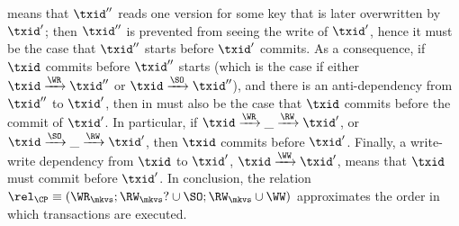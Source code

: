 means that $\txid''$ reads one version for some key that 
is later overwritten by $\txid'$; then $\txid''$ is prevented from seeing the write of $\txid'$, 
hence it {must} be the case that $\txid''$ starts before 
$\txid'$ commits. 
As a consequence, if $\txid$ commits before $\txid''$ starts (which is the case if 
either $\txid \xrightarrow{\WR} \txid''$ or $\txid \xrightarrow{\SO} \txid''$), 
and there is an anti-dependency 
from $\txid''$ to $\txid'$, then in {must} also be the case that $\txid$ commits before 
the commit of $\txid'$. In particular, if $\txid \xrightarrow{\WR} \_ \xrightarrow{\RW} \txid'$, 
or $\txid \xrightarrow{\SO} \_ \xrightarrow{\RW} \txid'$, then $\txid$ commits before $\txid'$.
Finally, a write-write dependency from $\txid$ to $\txid'$, $\txid \xrightarrow{\WW} \txid'$, means that $\txid$ {must} commit before $\txid'$. 
In conclusion, the relation $\rel_{\CP} \equiv (\WR_{\mkvs}; \RW_{\mkvs}? \cup \SO;  \RW_{\mkvs} \cup \WW)$ 
approximates the order in which transactions are executed. 

